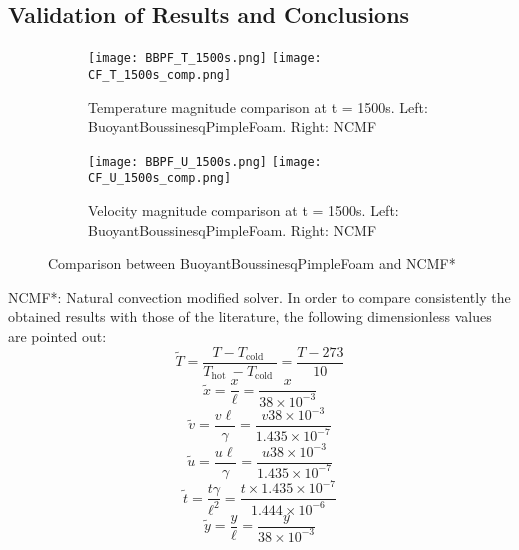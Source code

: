 \subsection{Validation of Results and Conclusions}
\begin{figure}[h!]
	\centering
	\begin{subfigure}{\linewidth}
	\texttt{[image: BBPF\_T\_1500s.png]}\hfill
	\texttt{[image: CF\_T\_1500s\_comp.png]}	
	\caption{Temperature magnitude comparison at t = 1500s. Left: BuoyantBoussinesqPimpleFoam. Right: NCMF}
	\label{BBPF_NCMF}
	\end{subfigure}\par\medskip
	\begin{subfigure}{\linewidth}
	\texttt{[image: BBPF\_U\_1500s.png]}\hfill
	\texttt{[image: CF\_U\_1500s\_comp.png]}	
	\caption{Velocity magnitude comparison at t = 1500s. Left: BuoyantBoussinesqPimpleFoam. Right: NCMF}
	\end{subfigure}\par\medskip
	\caption{Comparison between BuoyantBoussinesqPimpleFoam and NCMF*}
\end{figure} 
NCMF*: Natural convection modified solver.
\newline
In order to compare consistently the obtained results with those of the literature, the following dimensionless values are pointed out:
\begin{equation}
\tilde{T}=\frac{T-T_{\text {cold }}}{T_{\text {hot }}-T_{\text {cold }}}=\frac{T-273}{10}
\label{3.28}
\end{equation}
\begin{equation}
\tilde{x}=\frac{x}{\ell}=\frac{x}{38 \times 10^{-3}}
\label{3.29}
\end{equation}
\begin{equation}
\tilde{v}=\frac{v \ell}{\gamma}=\frac{v 38 \times 10^{-3}}{1.435 \times 10^{-7}}
\label{3.30}
\end{equation}
\begin{equation}
\tilde{u}=\frac{u \ell}{\gamma}=\frac{u 38 \times 10^{-3}}{1.435 \times 10^{-7}}
\label{3.31}
\end{equation}
\begin{equation}
\tilde{t}=\frac{t \gamma}{\ell^{2}}=\frac{t \times 1.435 \times 10^{-7}}{1.444 \times 10^{-6}}
\label{3.32}
\end{equation}
\begin{equation}
\tilde{y}=\frac{y}{\ell}=\frac{y}{38 \times 10^{-3}}
\label{3.33}
\end{equation}
